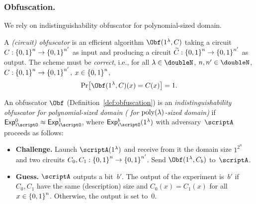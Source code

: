 \subsubsection{Obfuscation.}
We rely on indistinguishability obfuscator for polynomial-sized domain.

\begin{definition}\label{def:obfuscation}
A \emph{(circuit) obfuscator} is an efficient algorithm
$\Obf(1^\lambda,C)$
taking a circuit ${C:{\{0,1\}}^n\to{\{0,1\}}^{n'}}$ as input
and producing a circuit ${\widetilde{C}:{\{0,1\}}^n\to{\{0,1\}}^{n'}}$ as output.
The scheme must be \emph{correct}, i.e., for all
${\lambda\in\doubleN}$,
${n,n'\in\doubleN}$,
${C:{\{0,1\}}^n\to{\{0,1\}}^{n'}}$,
${x\in{\{0,1\}}^n}$,
\begin{align*}
\Pr\bigl[
\Obf(1^\lambda,C)(x)=C(x)
\bigr]=1.
\end{align*}
\end{definition}

\begin{definition}
\label{def:obfuscation-security}
An obfuscator $\Obf$ (Definition~\ref{def:obfuscation}) is
an \emph{indistinguishability obfuscator for polynomial-sized domain
({\iO} for $\operatorname{poly}(\lambda)$-sized domain)}
if ${\ExpIO{0}\approx\ExpIO{1}}$,
where $\ExpIO{b}(1^\lambda)$ with adversary~$\scriptA$ proceeds as follows:
\begin{itemize}\upshape
\item\textbf{Challenge.}
Launch $\scriptA(1^\lambda)$ and receive from it
the domain size $1^{2^n}$ and two circuits ${C_0,C_1:{\{0,1\}}^n\to{\{0,1\}}^{n'}}$.
Send $\Obf(1^\lambda,C_b)$ to~$\scriptA$.
\item\textbf{Guess.}
$\scriptA$ outputs a bit~$b'$.
The output of the experiment is~$b'$ if $C_0,C_1$ have the same (description) size and ${C_0(x)=C_1(x)}$ for all~${x\in{\{0,1\}}^n}$.
Otherwise, the output is set to~$0$.
\end{itemize}
\end{definition}
